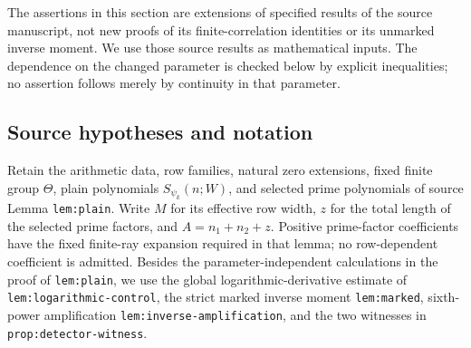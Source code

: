 \documentclass[11pt,a4paper]{article}
\numberwithin{equation}{section}
\theoremstyle{remark}
\begin{document}
The assertions in this section are extensions of specified results of the
source manuscript, not new proofs of its finite-correlation identities or
its unmarked inverse moment.  We use those source results as mathematical
inputs.  The dependence on the changed parameter is checked below by explicit
inequalities; no assertion follows merely by continuity in that parameter.

\subsection{Source hypotheses and notation}
Retain the arithmetic data, row families, natural zero extensions, fixed
finite group $\Theta$, plain polynomials $S_{\psi_k}(n;W)$, and selected
prime polynomials of source Lemma \texttt{lem:plain}.  Write $M$ for its
effective row width, $z$ for the total length of the selected prime factors,
and $A=n_1+n_2+z$.  Positive prime-factor coefficients have the fixed
finite-ray expansion required in that lemma; no row-dependent coefficient
is admitted.  Besides the parameter-independent calculations in the proof
of \texttt{lem:plain}, we use the global logarithmic-derivative estimate of
\texttt{lem:logarithmic-control}, the strict marked inverse moment
\texttt{lem:marked}, sixth-power amplification
\texttt{lem:inverse-amplification}, and the two witnesses in
\texttt{prop:detector-witness}.
\end{document}
